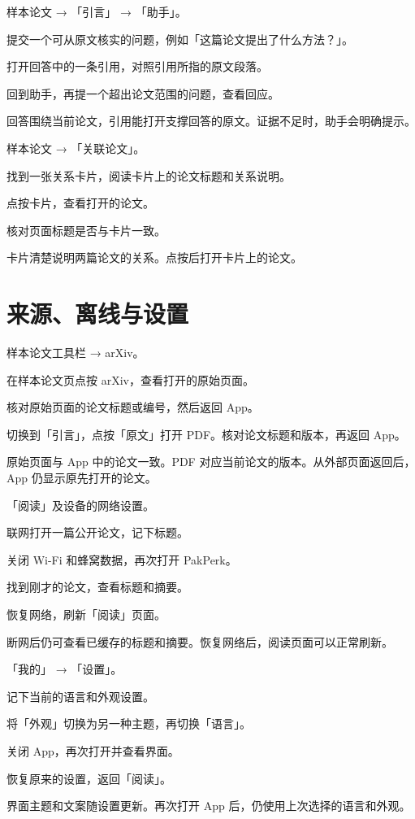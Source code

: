 \documentclass[UTF8,a4paper,zihao=-4,fontset=fandol]{ctexart}
\newcommand{\ui}[1]{「#1」}
\begin{document}
  {样本论文 → \ui{引言} → \ui{助手}。}
  {\item 提交一个可从原文核实的问题，例如「这篇论文提出了什么方法？」。
   \item 打开回答中的一条引用，对照引用所指的原文段落。
   \item 回到助手，再提一个超出论文范围的问题，查看回应。}
  {回答围绕当前论文，引用能打开支撑回答的原文。证据不足时，助手会明确提示。}

  {样本论文 → \ui{关联论文}。}
  {\item 找到一张关系卡片，阅读卡片上的论文标题和关系说明。
   \item 点按卡片，查看打开的论文。
   \item 核对页面标题是否与卡片一致。}
  {卡片清楚说明两篇论文的关系。点按后打开卡片上的论文。}

\clearpage
{}
\section{来源、离线与设置}

  {样本论文工具栏 → arXiv。}
  {\item 在样本论文页点按 arXiv，查看打开的原始页面。
   \item 核对原始页面的论文标题或编号，然后返回 App。
   \item 切换到\ui{引言}，点按\ui{原文}打开 PDF。核对论文标题和版本，再返回 App。}
  {原始页面与 App 中的论文一致。PDF 对应当前论文的版本。从外部页面返回后，App 仍显示原先打开的论文。}

  {\ui{阅读}及设备的网络设置。}
  {\item 联网打开一篇公开论文，记下标题。
   \item 关闭 Wi-Fi 和蜂窝数据，再次打开 PakPerk。
   \item 找到刚才的论文，查看标题和摘要。
   \item 恢复网络，刷新\ui{阅读}页面。}
  {断网后仍可查看已缓存的标题和摘要。恢复网络后，阅读页面可以正常刷新。}

  {\ui{我的} → \ui{设置}。}
  {\item 记下当前的语言和外观设置。
   \item 将\ui{外观}切换为另一种主题，再切换\ui{语言}。
   \item 关闭 App，再次打开并查看界面。
   \item 恢复原来的设置，返回\ui{阅读}。}
  {界面主题和文案随设置更新。再次打开 App 后，仍使用上次选择的语言和外观。}
\end{document}
